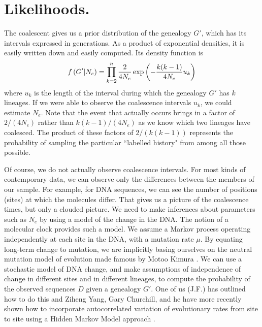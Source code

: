 \section{Likelihoods.}

\def\Prob{\mathop{\rm Prob}\nolimits}

The coalescent gives us a prior distribution of the genealogy $G'$, which
has its intervals expressed in generations.  As a product of exponential
densities, it is easily written down and easily computed.  Its density
function is
\begin{equation} %
f\left(G'|N_e\right) =
\prod_{k=2}^n {2 \over 4N_e}\exp\left(- {k(k-1) \over 4N_e} u_k \right)
\label{eq:basic}
\end{equation}
where $u_k$ is the length of the interval during which the genealogy $G'$
has $k$ lineages.  If we were  able to observe the coalescence intervals $u_k$,
we could estimate $N_e$.  Note that the event that actually occurs brings in
a factor of $2/(4N_e)$ rather than $k(k-1)/(4N_e)$ as we know which two
lineages have coalesced.  The product of these factors of $2/(k(k-1))$
represents the
probability of sampling the particular ``labelled history" \cite{Edwards70}
from among all those possible.

Of course, we do not actually observe coalescence intervals.  For most
kinds of contemporary data, we can observe only the differences between
the members of our sample.  For example, for DNA sequences, we can see
the number of positions (sites) at which the molecules differ.  That
gives us a picture of the coalescence times, but only a clouded picture.
We need to make inferences about parameters such as $N_e$ by using a
model of the change in the DNA.  The notion of a molecular clock
provides such a model.  We assume a Markov process operating independently
at each site in the DNA, with a mutation rate $\mu$.  By equating long-term
change to mutation, we are implicitly basing ourselves on the neutral
mutation model of evolution made famous by Motoo Kimura
\cite{Kimura68,Kimura83}.
We can use a stochastic model of DNA change, and make assumptions of
independence of change in different sites and in different lineages, to compute
the probability of the observed sequences $D$ given a genealogy $G'$.
One of us (J.F.) has outlined how to do this
\cite{Fels81} and Ziheng Yang, Gary Churchill, and he
have more recently shown how to incorporate autocorrelated variation
of evolutionary rates from site to site using a Hidden Markov Model approach
\cite{Yang93, Yang94, Yang95, Fels96}.

